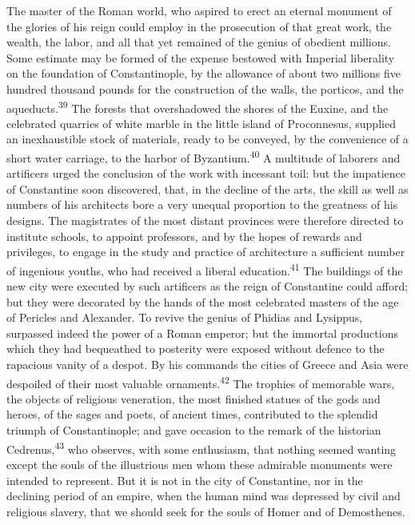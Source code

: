 The master of the Roman world, who aspired to erect an eternal
monument of the glories of his reign could employ in the
prosecution of that great work, the wealth, the labor, and all
that yet remained of the genius of obedient millions. Some
estimate may be formed of the expense bestowed with Imperial
liberality on the foundation of Constantinople, by the allowance
of about two millions five hundred thousand pounds for the
construction of the walls, the porticos, and the aqueducts.\textsuperscript{39}
The forests that overshadowed the shores of the Euxine, and the
celebrated quarries of white marble in the little island of
Proconnesus, supplied an inexhaustible stock of materials, ready
to be conveyed, by the convenience of a short water carriage, to
the harbor of Byzantium.\textsuperscript{40} A multitude of laborers and
artificers urged the conclusion of the work with incessant toil:
but the impatience of Constantine soon discovered, that, in the
decline of the arts, the skill as well as numbers of his
architects bore a very unequal proportion to the greatness of his
designs. The magistrates of the most distant provinces were
therefore directed to institute schools, to appoint professors,
and by the hopes of rewards and privileges, to engage in the
study and practice of architecture a sufficient number of
ingenious youths, who had received a liberal education.\textsuperscript{41} The
buildings of the new city were executed by such artificers as the
reign of Constantine could afford; but they were decorated by the
hands of the most celebrated masters of the age of Pericles and
Alexander. To revive the genius of Phidias and Lysippus,
surpassed indeed the power of a Roman emperor; but the immortal
productions which they had bequeathed to posterity were exposed
without defence to the rapacious vanity of a despot. By his
commands the cities of Greece and Asia were despoiled of their
most valuable ornaments.\textsuperscript{42} The trophies of memorable wars, the
objects of religious veneration, the most finished statues of the
gods and heroes, of the sages and poets, of ancient times,
contributed to the splendid triumph of Constantinople; and gave
occasion to the remark of the historian Cedrenus,\textsuperscript{43} who
observes, with some enthusiasm, that nothing seemed wanting
except the souls of the illustrious men whom these admirable
monuments were intended to represent. But it is not in the city
of Constantine, nor in the declining period of an empire, when
the human mind was depressed by civil and religious slavery, that
we should seek for the souls of Homer and of Demosthenes.

